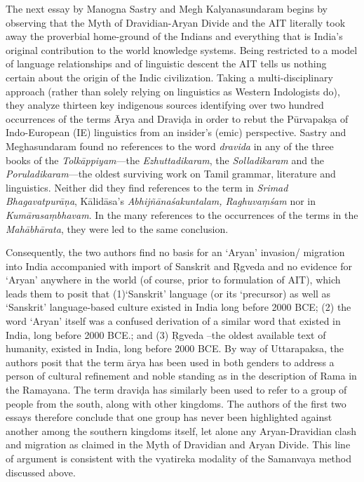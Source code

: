 The next essay by Manogna Sastry and Megh Kalyanasundaram begins by observing that the Myth of Dravidian-Aryan Divide and the AIT literally took away the proverbial home-ground of the Indians and everything that is India’s original contribution to the world knowledge systems. Being restricted to a model of language relationships and of linguistic descent the AIT tells us nothing certain about the origin of the Indic civilization. Taking a multi-disciplinary approach (rather than solely relying on linguistics as Western Indologists do), they analyze thirteen key indigenous sources identifying over two hundred occurrences of the terms Ārya and Draviḍa in order to rebut the Pūrvapakṣa of Indo-European (IE) linguistics from an insider’s (emic) perspective. Sastry and Meghasundaram found no references to the word \textit{dravida} in any of the three books of the \textit{Tolkāppiyam}—the \textit{Ezhuttadikaram}, the \textit{Solladikaram} and the \textit{Poruladikaram}—the oldest surviving work on Tamil grammar, literature and linguistics. Neither did they find references to the term in \textit{Srimad Bhagavatpurāṇa}, Kālidāsa’s \textit{Abhijñānaśakuntalam, Raghuvaṃśam} nor in \textit{Kumārasaṃbhavam}. In the many references to the occurrences of the terms in the \textit{Mahābhārata}, they were led to the same conclusion.

Consequently, the two authors find no basis for an ‘Aryan’ invasion/ migration into India accompanied with import of Sanskrit and Ŗgveda and no evidence for ‘Aryan’ anywhere in the world (of course, prior to formulation of AIT), which leads them to posit that (1)‘Sanskrit’ language (or its ‘precursor) as well as ‘Sanskrit’ language-based culture existed in India long before 2000 BCE; (2) the word ‘Aryan’ itself was a confused derivation of a similar word that existed in India, long before 2000 BCE.; and (3) Ŗgveda –the oldest available text of humanity, existed in India, long before 2000 BCE. By way of Uttarapaksa, the authors posit that the term ārya has been used in both genders to address a person of cultural refinement and noble standing as in the description of Rama in the Ramayana. The term draviḍa has similarly been used to refer to a group of people from the south, along with other kingdoms. The authors of the first two essays therefore conclude that one group has never been highlighted against another among the southern kingdoms itself, let alone any Aryan-Dravidian clash and migration as claimed in the Myth of Dravidian and Aryan Divide. This line of argument is consistent with the vyatireka modality of the Samanvaya method discussed above.

